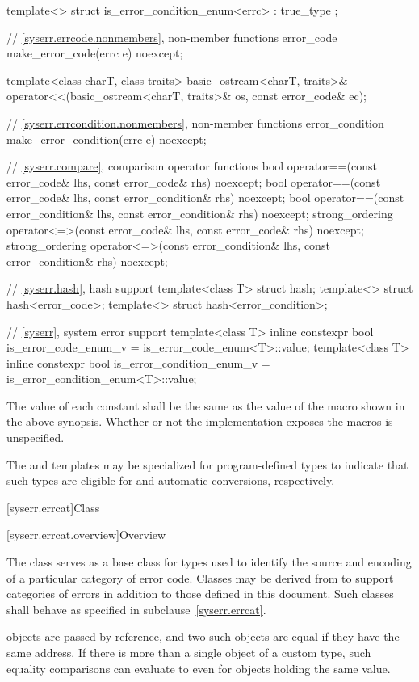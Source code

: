 \begin{codeblock}
{  template<> struct is_error_condition_enum<errc> : true_type {};

  // \ref{syserr.errcode.nonmembers}, non-member functions
  error_code make_error_code(errc e) noexcept;

  template<class charT, class traits>
    basic_ostream<charT, traits>&
      operator<<(basic_ostream<charT, traits>& os, const error_code& ec);

  // \ref{syserr.errcondition.nonmembers}, non-member functions
  error_condition make_error_condition(errc e) noexcept;

  // \ref{syserr.compare}, comparison operator functions
  bool operator==(const error_code& lhs, const error_code& rhs) noexcept;
  bool operator==(const error_code& lhs, const error_condition& rhs) noexcept;
  bool operator==(const error_condition& lhs, const error_condition& rhs) noexcept;
  strong_ordering operator<=>(const error_code& lhs, const error_code& rhs) noexcept;
  strong_ordering operator<=>(const error_condition& lhs, const error_condition& rhs) noexcept;

  // \ref{syserr.hash}, hash support
  template<class T> struct hash;
  template<> struct hash<error_code>;
  template<> struct hash<error_condition>;

  // \ref{syserr}, system error support
  template<class T>
    inline constexpr bool is_error_code_enum_v = is_error_code_enum<T>::value;
  template<class T>
    inline constexpr bool is_error_condition_enum_v = is_error_condition_enum<T>::value;
}
\end{codeblock}

\pnum
The value of each  constant shall be the same as
the value of the  macro shown in the above synopsis.
Whether or not the  implementation
exposes the  macros is unspecified.

\pnum
The  and  templates may be
specialized for program-defined types to indicate that such types are eligible
for  and  automatic
conversions, respectively.

[syserr.errcat]{Class }

[syserr.errcat.overview]{Overview}

\pnum
The class  serves as a base class for types used
to identify the source and encoding of a particular category of error code.
Classes may be derived from  to support
categories of errors in addition to those defined in this document.
Such classes shall behave as specified in subclause~\ref{syserr.errcat}.
\begin{note}
 objects are
passed by reference, and two such objects
are equal if they have the same address.
If there is more than a single object of a custom  type,
such equality comparisons can evaluate to 
even for objects holding the same value.
\end{note}

